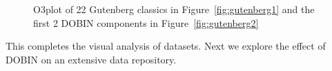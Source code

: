 \documentclass[11pt]{article}
\begin{document}
\begin{figure}
	\centering
	\caption{O3plot of 22 Gutenberg classics in Figure~\ref{fig:gutenberg1} and the first 2 DOBIN components in Figure~\ref{fig:gutenberg2} }
	\label{fig:gutenberg}
\end{figure}

This completes the visual analysis of datasets. Next we  explore the effect of DOBIN on an extensive data repository. 

\end{document}
